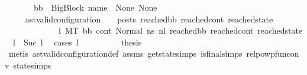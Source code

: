 \begin{isabellebody}
\ \ \ \ \ \ \ {\isachardoublequoteopen}bb{}\ {\isacharequal}{\kern0pt}\ BigBlock\ name\ {\isacharbrackleft}{\kern0pt}{\isacharbrackright}{\kern0pt}\ None\ None{\isachardoublequoteclose}\ \isanewline
\ \ \ \ \ {\isachardoublequoteopen}{\isacharparenleft}{\kern0pt}ast{\isacharunderscore}{\kern0pt}valid{\isacharunderscore}{\kern0pt}configuration\ {\isasymLambda}\ {\isasymGamma}\ {\isasymOmega}\ posts\ reached{\isacharunderscore}{\kern0pt}bb\ reached{\isacharunderscore}{\kern0pt}cont\ reached{\isacharunderscore}{\kern0pt}state{\isacharparenright}{\kern0pt}\ {\isasymor}\ \isanewline
\ \ \ \ \ \ \ \ \ \ \ \ {\isacharparenleft}{\kern0pt}{\isasymexists}\ l{}{\isachardot}{\kern0pt}\ {\isacharparenleft}{\kern0pt}M{\isacharcomma}{\kern0pt}{\isasymLambda}{\isacharcomma}{\kern0pt}{\isasymGamma}{\isacharcomma}{\kern0pt}{\isasymOmega}{\isacharcomma}{\kern0pt}T\ {\isasymturnstile}{\isacharparenleft}{\kern0pt}bb{}{\isacharcomma}{\kern0pt}\ cont{}{\isacharcomma}{\kern0pt}\ Normal\ ns{}{\isacharparenright}{\kern0pt}\ {\isacharminus}{\kern0pt}n{\isasymlongrightarrow}{\isacharcircum}{\kern0pt}l{}\ {\isacharparenleft}{\kern0pt}reached{\isacharunderscore}{\kern0pt}bb{\isacharcomma}{\kern0pt}\ reached{\isacharunderscore}{\kern0pt}cont{\isacharcomma}{\kern0pt}\ reached{\isacharunderscore}{\kern0pt}state{\isacharparenright}{\kern0pt}{\isacharparenright}{\kern0pt}\ {\isasymand}\ {\isacharparenleft}{\kern0pt}l\ {\isacharequal}{\kern0pt}\ Suc\ l{}{\isacharparenright}{\kern0pt}\ {\isacharparenright}{\kern0pt}{\isachardoublequoteclose}\isanewline
%
\isadelimproof
%
\endisadelimproof
%
\isatagproof
{}\isamarkupfalse%
\ {\isacharparenleft}{\kern0pt}cases\ l{\isacharparenright}{\kern0pt}\isanewline
\ \ \isamarkupfalse%
\ {}\isanewline
\ \ \isamarkupfalse%
\ \isamarkupfalse%
\ {\isacharquery}{\kern0pt}thesis\ \isamarkupfalse%
\ {\isacharparenleft}{\kern0pt}metis\ ast{\isacharunderscore}{\kern0pt}valid{\isacharunderscore}{\kern0pt}configuration{\isacharunderscore}{\kern0pt}def\ assms{\isacharparenleft}{\kern0pt}{}{\isacharparenright}{\kern0pt}\ get{\isacharunderscore}{\kern0pt}state{\isachardot}{\kern0pt}simps\ is{\isacharunderscore}{\kern0pt}final{\isachardot}{\kern0pt}simps{\isacharparenleft}{\kern0pt}{}{\isacharparenright}{\kern0pt}\ relpowp{\isacharunderscore}{\kern0pt}fun{\isacharunderscore}{\kern0pt}conv\ state{\isachardot}{\kern0pt}simps{\isacharparenleft}{\kern0pt}{}{\isacharparenright}{\kern0pt}{\isacharparenright}{\kern0pt}\isanewline

\end{isabellebody}

